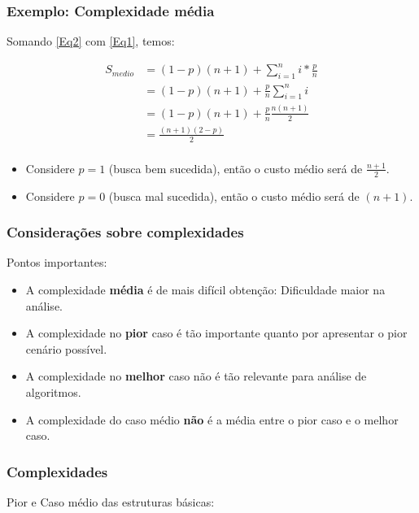 \documentclass[10pt]{beamer}
\begin{document}
\begin{frame}
    \frametitle{Exemplo: Complexidade média}
    Somando \ref{Eq2} com \ref{Eq1}, temos:

    \begin{align*}
        S_{medio} & = (1-p) (n+1) + \sum_{i=1}^n i*\frac{p}{n}  \\
                  & = (1-p)(n+1) + \frac{p}{n} \sum_{i=1}^n i   \\
                  & = (1-p)(n+1) + \frac{p}{n} \frac{n(n+1)}{2} \\
                  & = \frac{(n+1)(2-p)}{2}                      \\
    \end{align*}

    \begin{itemize}
        \item Considere $p=1$ (busca bem sucedida), então o custo médio será de $\frac{n+1}{2}$.
        \item Considere $p=0$ (busca mal sucedida), então o custo médio será de $(n+1)$.
    \end{itemize}
\end{frame}


\begin{frame}
    \frametitle{Considerações sobre complexidades}

    Pontos importantes:

    \begin{itemize}
        \item A complexidade \textbf{média} é de mais difícil obtenção: Dificuldade maior na análise.
        \item A complexidade no \textbf{pior} caso é tão importante quanto por apresentar o pior cenário possível.
        \item A complexidade no \textbf{melhor} caso não é tão relevante para análise de algoritmos.
        \item A complexidade do caso médio \textbf{não} é a média entre o pior caso e o melhor caso.

    \end{itemize}
\end{frame}
\begin{frame}[t]
    \frametitle{Complexidades}
    Pior e Caso médio das estruturas básicas:
    \begin{table}[]
    \end{table}
\end{frame}
\end{document}
